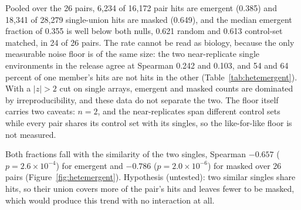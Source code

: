 
 Pooled over the 26 pairs, 6,234
of 16,172 pair hits are emergent (0.385) and 18,341 of 28,279 single-union hits are
masked (0.649), and the median emergent fraction of 0.355 is well below both nulls, 0.621
random and 0.613 control-set matched, in 24 of 26 pairs. The rate cannot be read as
biology, because the only measurable noise floor is of the same size: the two
near-replicate single environments in the release agree at Spearman 0.242 and 0.103, and
54 and 64 percent of one member's hits are not hits in the other
(Table~\ref{tab:hetemergent}). With a $|z| > 2$ cut on single arrays, emergent and masked
counts are dominated by irreproducibility, and these data do not separate the two. The
floor itself carries two caveats: $n = 2$, and the near-replicates span different control
sets while every pair shares its control set with its singles, so the like-for-like floor
is not measured.

Both fractions fall with the similarity of the two singles, Spearman $-0.657$
($p = 2.6 \times 10^{-4}$) for emergent and $-0.786$ ($p = 2.0 \times 10^{-6}$) for
masked over 26 pairs (Figure~\ref{fig:hetemergent}). Hypothesis (untested): two similar
singles share hits, so their union covers more of the pair's hits and leaves fewer to be
masked, which would produce this trend with no interaction at all.

\begin{table}[htbp]
\centering
\scriptsize
\caption[]{Hit-level composition against the two nulls, and the noise floor that bounds
what it can mean. A hit is robust $|z| > 2$ within an environment. The nulls replace the
matched singles by random YPD singles, 200 draws, the second restricted to singles
sharing a control set with the pair. The last two rows are the only near-replicate single
environments in the release, two 5-fluorouracil doses within 1 percent; their hit
discordance exceeds the median emergent fraction above.}
\label{tab:hetemergent}

\end{table}

